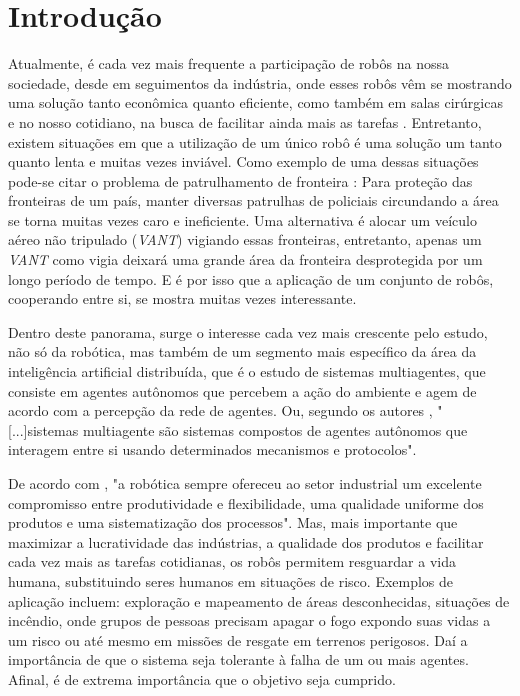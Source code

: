 %
%

\chapter{Introdução}\label{chap:introducao}
Atualmente, é cada vez mais frequente a participação de robôs na nossa sociedade, desde em seguimentos da indústria, onde esses robôs vêm se mostrando uma solução tanto econômica quanto eficiente, como também em salas cirúrgicas e no nosso cotidiano, na busca de facilitar ainda mais as tarefas \cite{HCWSNX02,CMHL08}. Entretanto, existem situações em que a utilização de um único robô é uma solução um tanto quanto lenta e muitas vezes inviável. Como exemplo de uma dessas situações pode-se citar o problema de patrulhamento de fronteira \cite{CMAJJBC08} : Para proteção das fronteiras de um país, manter diversas patrulhas de policiais circundando a área se torna muitas vezes caro e ineficiente. Uma alternativa é alocar um veículo aéreo não tripulado (\emph{VANT}) vigiando essas fronteiras, entretanto, apenas um \emph{VANT} como vigia deixará uma grande área da fronteira desprotegida por um longo período de tempo. E é por isso que a aplicação de um conjunto de robôs, cooperando entre si, se mostra muitas vezes interessante.  

Dentro deste panorama, surge o interesse cada vez mais crescente pelo estudo, não só da robótica, mas também de um segmento mais específico da área da inteligência artificial distribuída, que é o estudo de sistemas multiagentes, que consiste em agentes autônomos que percebem a ação do ambiente e agem de acordo com a percepção da rede de agentes. Ou, segundo os autores , "[...]sistemas multiagente são sistemas compostos de agentes autônomos que interagem entre si usando determinados mecanismos e protocolos". %

De acordo com  , "a robótica sempre ofereceu ao setor industrial um excelente compromisso entre produtividade e flexibilidade, uma qualidade uniforme dos produtos e uma sistematização dos processos". Mas, mais importante que maximizar a lucratividade das indústrias, a qualidade dos produtos e facilitar cada vez mais as tarefas cotidianas, os robôs permitem resguardar a vida humana, substituindo seres humanos em situações de risco. Exemplos de aplicação incluem: exploração e mapeamento de áreas desconhecidas, situações de incêndio, onde grupos de pessoas precisam apagar o fogo expondo suas vidas a um risco ou até mesmo em missões de resgate em terrenos perigosos. Daí a importância de que o sistema seja tolerante à falha de um ou mais agentes. Afinal, é de extrema importância que o objetivo seja cumprido.

